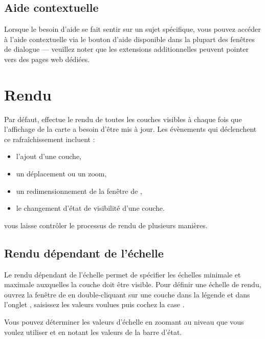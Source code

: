 \subsection{Aide contextuelle} \label{context_help}

Lorsque le besoin d'aide se fait sentir sur un sujet spécifique, vous pouvez accéder à l'aide contextuelle via le bouton d'aide disponible dans la plupart des fenêtres de dialogue — veuillez noter que les extensions additionnelles peuvent pointer vers des pages web dédiées.

\section{Rendu} \label{subsec:redraw_events} 

Par défaut, \qg effectue le rendu de toutes les couches visibles à chaque fois que l'affichage de la carte a besoin d'être mis à jour. Les évènements qui déclenchent ce rafraîchissement incluent :

\begin{itemize}[label=--]
\item l'ajout d'une couche,
\item un déplacement ou un zoom,
\item un redimensionnement de la fenêtre de \qg,
\item le changement d'état de visibilité d'une couche.
\end{itemize}

\qg vous laisse contrôler le processus de rendu de plusieurs manières.

\subsection{Rendu dépendant de l'échelle} 
\label{label_scaledepend}

Le rendu dépendant de l'échelle permet de spécifier les échelles minimale et maximale auxquelles la couche doit être visible. Pour définir une échelle de rendu, ouvrez la fenêtre de  en double-cliquant sur une couche dans la légende et dans l'onglet , saisissez les valeurs voulues puis cochez la case .

Vous pouvez déterminer les valeurs d'échelle en zoomant au niveau que vous voulez utiliser et en notant les valeurs de la barre d'état.

